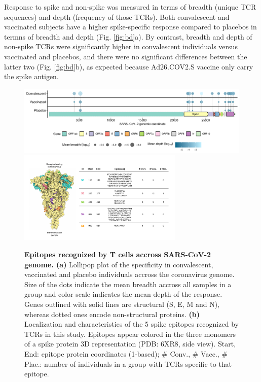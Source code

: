 Response to \covid{} spike and non-spike was measured in terms of breadth (unique TCR sequences) and depth (frequency of those TCRs). Both convalescent and vaccinated subjects have a higher spike-specific response compared to placebos in termns of breadth and depth (Fig. \ref{fig:bd}a). By contrast, breadth and depth of non-spike TCRs were significantly higher in convalescent individuals versus vaccinated and placebos, and there were no significant differences between the latter two (Fig. \ref{fig:bd}b), as expected because Ad26.COV2.S vaccine only carry the spike antigen.


\begin{figure}[!t]
	\centering
	\includegraphics[width=\textwidth,keepaspectratio]{figures/hits.pdf}
	\includegraphics[width=0.7\textwidth,keepaspectratio]{figures/spike_w_table.pdf}
	\caption{\textbf{Epitopes recognized by T cells accross SARS-CoV-2 genome. (a)} Lollipop plot of the \TCRB{} \covid{} specificity in convalescent, vaccinated and placebo individuals accross the coronavirus genome. Size of the dots indicate the mean breadth accross all samples in a group and color scale indicates the mean depth of the response. Genes outlined with solid lines are structural (S, E, M and N), whereas dotted ones encode non-structural proteins. \textbf{(b)} Localization and characteristics of the 5 \covid{} spike epitopes recognized by TCRs in this study. Epitopes appear colored in the three monomers of a spike protein 3D representation (PDB: 6XR8, side view). Start, End: epitope protein coordinates (1-based); \# Conv., \# Vacc., \# Plac.: number of individuals in a group with TCRs specific to that epitope.}
	\label{fig:hits}
\end{figure}

